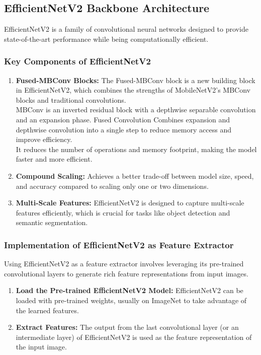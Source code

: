 \subsection{EfficientNetV2 Backbone Architecture}
EfficientNetV2 is a family of convolutional neural networks designed to provide state-of-the-art performance while being computationally efficient. 

\subsubsection{Key Components of EfficientNetV2}
\begin{enumerate}
    \item \textbf{Fused-MBConv Blocks: }The Fused-MBConv block is a new building block in EfficientNetV2, which combines the strengths of MobileNetV2’s MBConv blocks and traditional convolutions.\\
    MBConv is an inverted residual block with a depthwise separable convolution and an expansion phase.
    Fused Convolution Combines expansion and depthwise convolution into a single step to reduce memory access and improve efficiency.\\
    It reduces the number of operations and memory footprint, making the model faster and more efficient.
    \item \textbf{ Compound Scaling: }Achieves a better trade-off between model size, speed, and accuracy compared to scaling only one or two dimensions.
    \item \textbf{Multi-Scale Features: }EfficientNetV2 is designed to capture multi-scale features efficiently, which is crucial for tasks like object detection and semantic segmentation.
\end{enumerate}

\subsubsection{Implementation of EfficientNetV2 as Feature Extractor}
Using EfficientNetV2 as a feature extractor involves leveraging its pre-trained convolutional layers to generate rich feature representations from input images.

\begin{enumerate}
    \item \textbf{Load the Pre-trained EfficientNetV2 Model: }EfficientNetV2 can be loaded with pre-trained weights, usually on ImageNet to take advantage of the learned features. 
    \item \textbf{Extract Features: }The output from the last convolutional layer (or an intermediate layer) of EfficientNetV2 is used as the feature representation of the input image.
    
\end{enumerate}






